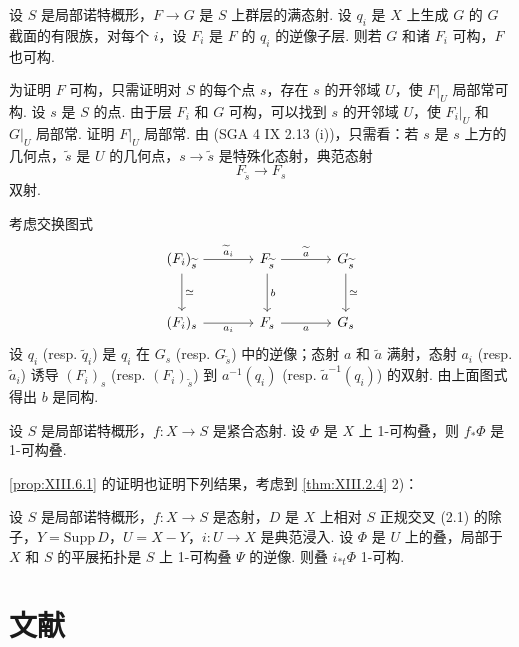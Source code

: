 \begin{lemma}\label{lem:XIII.6.1.2}
设 $S$ 是局部诺特概形，$F \to G$ 是 $S$ 上群层的满态射. 设 $q_i$ 是 $X$ 上生成 $G$ 的 $G$ 截面的有限族，对每个 $i$，设 $F_i$ 是 $F$ 的 $q_i$ 的逆像子层. 则若 $G$ 和诸 $F_i$ 可构，$F$ 也可构.
\end{lemma}

为证明 $F$ 可构，只需证明对 $S$ 的每个点 $s$，存在 $s$ 的开邻域 $U$，使 $F|_U$ 局部常可构. 设 $s$ 是 $S$ 的点. 由于层 $F_i$ 和 $G$ 可构，可以找到 $s$ 的开邻域 $U$，使 $F_i|_U$ 和 $G|_U$ 局部常. 证明 $F|_U$ 局部常. 由 (SGA 4 IX 2.13 (i))，只需看：若 $s$ 是 $s$ 上方的几何点，$\widetilde{s}$ 是 $U$ 的几何点，$s \to \widetilde{s}$ 是特殊化态射，典范态射
\[
F_{\widetilde{s}} \longrightarrow F_s
\]
双射.

考虑交换图式
\[
\begin{tikzcd}[row sep=large, column sep=large]
(F_i)_{\widetilde{s}} \arrow[r,"{\widetilde{a}_i}"] \arrow[d,"{\simeq}"] & F_{\widetilde{s}} \arrow[r,"{\widetilde{a}}"] \arrow[d,"{b}"] & G_{\widetilde{s}} \arrow[d,"{\simeq}"] \\
(F_i)_s \arrow[r,"{a_i}"'] & F_s \arrow[r,"{a}"'] & G_s
\end{tikzcd}
\]
设 $q_i$ (resp. $\widetilde{q}_i$) 是 $q_i$ 在 $G_s$ (resp. $G_{\widetilde{s}}$) 中的逆像；态射 $a$ 和 $\widetilde{a}$ 满射，态射 $a_i$ (resp. $\widetilde{a}_i$) 诱导 $(F_i)_s$ (resp. $(F_i)_{\widetilde{s}}$) 到 $a^{-1}(q_i)$ (resp. $\widetilde{a}^{-1}(q_i)$) 的双射. 由上面图式得出 $b$ 是同构.

\begin{corollary}\label{cor:XIII.6.2}
设 $S$ 是局部诺特概形，$f \colon X \to S$ 是紧合态射. 设 $\Phi$ 是 $X$ 上 1-可构叠，则 $f_* \Phi$ 是 1-可构叠.
\end{corollary}

\ref{prop:XIII.6.1} 的证明也证明下列结果，考虑到 \ref{thm:XIII.2.4} 2)：

\begin{corollary}\label{cor:XIII.6.3}
设 $S$ 是局部诺特概形，$f \colon X \to S$ 是态射，$D$ 是 $X$ 上相对 $S$ 正规交叉 (2.1) 的除子，$Y = \mathrm{Supp}\, D$，$U = X - Y$，$i \colon U \to X$ 是典范浸入. 设 $\Phi$ 是 $U$ 上的叠，局部于 $X$ 和 $S$ 的平展拓扑是 $S$ 上 1-可构叠 $\Psi$ 的逆像. 则叠 $i_{*t} \Phi$ 1-可构.
\end{corollary}

\section{文献}\printbibliography[heading=none]


